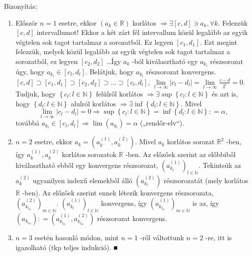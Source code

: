 \documentclass[12pt,a4paper]{scrartcl}
\providecommand{\tightlist}{%
  \setlength{\itemsep}{0pt}\setlength{\parskip}{0pt}}
\newenvironment{bizonyitas}{}{}
\begin{document}
\begin{bizonyitas}

Bizonyítás:

\begin{enumerate}
\def\labelenumi{\arabic{enumi}.}
\tightlist
\item
  Először \(n = 1\) esetre, ekkor
  \(\left( {a_{k} \in {\mathbb{R}}} \right)\) korlátos
  \(\left. \Rightarrow\exists\left\lbrack {c,d} \right\rbrack \ni a_{k},\forall k \right.\).
  Felezzük \(\left\lbrack {c,d} \right\rbrack\) intervallumot! Ekkor a
  két zárt fél intervallum közül legalább az egyik végtelen sok tagot
  tartalmaz a sorozatból. Ez legyen
  \(\left\lbrack {c_{1},d_{1}} \right\rbrack\). Ezt megint felezzük,
  melyek közül legalább az egyik végtelen sok tagot tartalmaz a
  sorozatból, ez legyen \(\left\lbrack {c_{2},d_{2}} \right\rbrack\)
  \ldots{}Így \(a_{k}\) -ból kiválasztható egy \(a_{k_{l}}\) részsorozat
  úgy, hogy \(a_{k_{l}} \in \left\lbrack {c_{l},d_{l}} \right\rbrack\).
  Belátjuk, hogy \(a_{k_{l}}\) részsorozat konvergens.\\
  \(\left\lbrack {c,d} \right\rbrack \supset \left\lbrack {c_{1},d_{1}} \right\rbrack \supset \left\lbrack {c_{2},d_{2}} \right\rbrack \supset ... \supset \left\lbrack {c_{l},d_{l}} \right\rbrack\),
  \(\underset{l\rightarrow\infty}{\lim}\left| {c_{l} - d_{l}} \right| = \underset{l\rightarrow\infty}{\lim}\frac{c - d}{2^{l}} = 0\).
  Tudjuk, hogy \(\left\{ {c_{l}:l \in {\mathbb{N}}} \right\}\) felülről
  korlátos
  \(\left. \Rightarrow\exists\sup\left\{ {c_{l}:l \in {\mathbb{N}}} \right\} \right.\)
  és azt is, hogy \(\left\{ {d_{l}:l \in {\mathbb{N}}} \right\}\)
  alulról korlátos
  \(\left. \Rightarrow\exists\inf\left\{ {d_{l}:l \in {\mathbb{N}}} \right\} \right.\).
  Mivel
  \[\left. \underset{l\rightarrow\infty}{\lim}\left| {c_{l} - d_{l}} \right| = 0\Rightarrow\sup\left\{ {c_{l}:l \in {\mathbb{N}}} \right\} = \inf\left\{ {d_{l}:l \in {\mathbb{N}}} \right\}: = \alpha \right.,\]
  továbbá
  \(\left. a_{k_{l}} \in \left\lbrack {c_{l},d_{l}} \right\rbrack\Rightarrow\lim\left( a_{k_{l}} \right) = \alpha \right.\)
  („rendőr-elv``).
\item
  \(n = 2\) esetre, ekkor
  \(a_{k} = \left( {a_{k}^{(1)},a_{k}^{(2)}} \right)\). Mivel \(a_{k}\)
  korlátos sorozat \({\mathbb{R}}^{2}\) -ben, így
  \(a_{k}^{(1)},a_{k}^{(2)}\) korlátos sorozatok \(\mathbb{R}\) -ben. Az
  előzőek szerint az előbbiből kiválasztható ebből egy konvergens
  részsorozat, \(\left( a_{k_{l}}^{(1)} \right)_{l \in {\mathbb{N}}}\).
  Tekintsük az \(a_{k}^{(2)}\) ugyanilyen indexű elemekből álló
  \(\left( a_{k_{l}}^{(2)} \right)\) részsorozatát (mely korlátos
  \(\mathbb{R}\) -ben). Az előzőek szerint ennek létezik konvergens
  részsorozata,
  \(\left( a_{k_{l_{m}}}^{(2)} \right)_{m \in {\mathbb{N}}}\).
  \(\left( a_{k_{l}}^{(1)} \right)_{l \in {\mathbb{N}}}\) konvergens,
  így \(\left( a_{k_{l_{m}}}^{(1)} \right)_{m \in {\mathbb{N}}}\) is az,
  így
  \(\left( a_{k_{l_{m}}} \right): = \left( {a_{k_{l_{m}}}^{(1)},a_{k_{l_{m}}}^{(2)}} \right)\)
  részsorozat konvergens.
\item
  \(n = 3\) esetén hasonló módon, mint \(n = 1\) -ről váltottunk
  \(n = 2\) -re, itt is igazolható (tkp teljes indukció). ■
\end{enumerate}


\end{bizonyitas}
\end{document}
